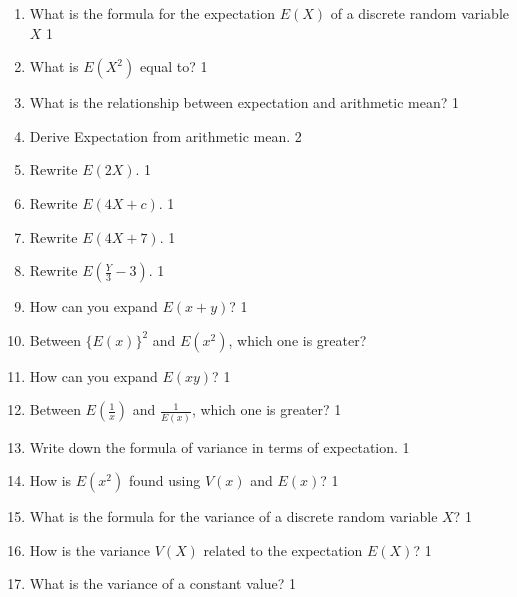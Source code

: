 \documentclass[a4paper,oneside, margin=1.4in]{book}
\begin{document}
\begin{enumerate}



\item What is the formula for the expectation \( E(X) \) of a discrete random variable \( X \) \hfill 1

\item What is $E(X^2)$ equal to? \hfill 1

\item What is the relationship between expectation and arithmetic mean?  \hfill 1

\item Derive Expectation from arithmetic mean.  \hfill 2

\item Rewrite $E(2X)$.  \hfill 1

\item Rewrite $E(4X + c)$.  \hfill 1

\item Rewrite $E(4X + 7)$.  \hfill 1

\item Rewrite $E(\frac Y3 - 3)$.  \hfill 1

\item How can you expand $E(x+y)$? \hfill 1

\item Between $\{E(x)\}^2$ and $E(x^2)$, which one is greater?

\item How can you expand $E(xy)$? \hfill 1

\item Between $\displaystyle E\left(\frac{1}{x}\right)$ and $\displaystyle \frac 1{E(x)}$, which one is greater? \hfill 1

\item Write down the formula of variance in terms of expectation. \hfill 1

\item How is \( E(x^2) \) found using \( V(x) \) and \( E(x) \)? \hfill 1

\item What is the formula for the variance of a discrete random variable \( X \)? \hfill 1

\item How is the variance \( V(X) \) related to the expectation \( E(X) \)? \hfill 1

\item What is the variance of a constant value? \hfill 1


\end{enumerate}
\end{document}
